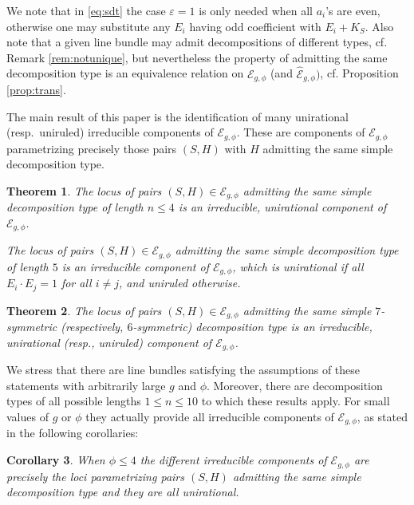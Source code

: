 \documentclass[11pt]{amsart}
\newtheorem{thm}{Theorem}[section]
\newtheorem{corollary}[thm]{Corollary}
\theoremstyle{definition}
\def\E{{\mathcal E}}
\renewcommand{\leq}{\leqslant}
\begin{document}
We note that in \eqref {eq:sdt} the case $\varepsilon=1$ is only needed when
all $a_i$'s are even, otherwise one may substitute any $E_i$ having odd
coefficient with $E_i+K_S$.  Also note that a given line
bundle may admit decompositions  of different types, cf. Remark \ref{rem:notunique},  but nevertheless the property of admitting the same decomposition type is an equivalence relation on $\E_{g,\phi}$ (and $\widehat{\E}_{g,\phi})$, cf. Proposition \ref{prop:trans}. 


The main result of this paper is the identification of many
unirational (resp.\ uniruled) irreducible components of $\E_{g,\phi}$.
These are components of $\E_{g,\phi}$
parametrizing precisely those pairs $(S,H)$ with $H$  admitting the
same simple decomposition type.



\begin{thm} \label{thm:dom}
  The locus of pairs $(S,H) \in \E_{g,\phi}$  admitting the same  simple decomposition type of length $n\leqslant 4$ is an irreducible, unirational component of $\E_{g,\phi}$.

 The locus of pairs $(S,H) \in \E_{g,\phi}$  admitting the same  simple decomposition type of length $5$ is an irreducible component of $\E_{g,\phi}$, which is unirational if all $E_i \cdot E_j=1$ for all $i \neq j$, and uniruled otherwise. 
\end{thm}


\begin{thm} \label{thm:dom2}
  The locus of pairs $(S,H) \in \E_{g,\phi}$  admitting the same  simple $7$-symmetric (respectively, $6$-symmetric) decomposition type is an irreducible, unirational 
(resp., uniruled) component of $\E_{g,\phi}$.
\end{thm}

   



We  stress  that there are line bundles satisfying the assumptions of
these statements with arbitrarily large  $g$ and $\phi$. 
Moreover, there are decomposition types of all possible lengths $1\leq
n \leq 10$ to which these results apply.
For small values of 
$g$ or $\phi$ they actually provide all irreducible components of
$\E_{g,\phi}$, as stated in the following corollaries:   


\begin{corollary} \label{cor:main1}
  When $\phi \leqslant 4$ the different  irreducible  components of $\E_{g,\phi}$ are precisely the loci  parametrizing pairs $(S,H)$ admitting the same  simple decomposition type   and they are all unirational. 
\end{corollary}
\end{document}
